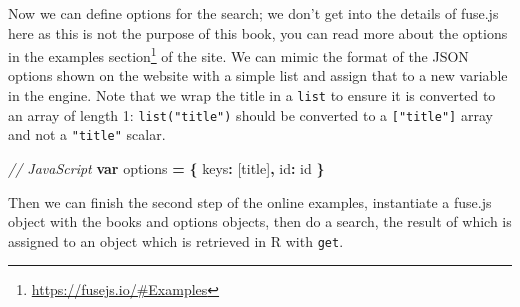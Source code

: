\documentclass[
  10pt,
]{krantz}
\makeatletter
\newenvironment{Shaded}{\begin{snugshade}}{\end{snugshade}}
\newcommand{\CommentTok}[1]{\textcolor[rgb]{0.37,0.37,0.37}{\textit{#1}}}
\newcommand{\DataTypeTok}[1]{\textcolor[rgb]{0.27,0.27,0.27}{#1}}
\newcommand{\KeywordTok}[1]{\textcolor[rgb]{0.27,0.27,0.27}{\textbf{#1}}}
\newcommand{\NormalTok}[1]{#1}
\newcommand{\OperatorTok}[1]{\textcolor[rgb]{0.43,0.43,0.43}{\textbf{#1}}}
\newcommand{\StringTok}[1]{\textcolor[rgb]{0.5,0.5,0.5}{#1}}
\renewcommand{\href}[2]{#2\footnote{\url{#1}}}
\newenvironment{kframe}{%
\medskip{}
\setlength{\fboxsep}{.8em}
 \def\at@end@of@kframe{}%
 \ifinner\ifhmode%
  \def\at@end@of@kframe{\end{minipage}}%
  \begin{minipage}{\columnwidth}%
 \fi\fi%
 \def\FrameCommand##1{\hskip\@totalleftmargin \hskip-\fboxsep
 \colorbox{shadecolor}{##1}\hskip-\fboxsep
     \hskip-\linewidth \hskip-\@totalleftmargin \hskip\columnwidth}%
 \MakeFramed {\advance\hsize-\width
   \@totalleftmargin\z@ \linewidth\hsize
   \@setminipage}}%
 {\par\unskip\endMakeFramed%
 \at@end@of@kframe}
\renewenvironment{Shaded}{\begin{kframe}}{\end{kframe}}
\makeatother
\begin{document}
Now we can define options for the search; we don't get into the details of fuse.js here as this is not the purpose of this book, you can read more about the options in the \href{https://fusejs.io/\#Examples}{examples section} of the site. We can mimic the format of the JSON options shown on the website with a simple list and assign that to a new variable in the engine. Note that we wrap the title in a \texttt{list} to ensure it is converted to an array of length 1: \texttt{list("title")} should be converted to a \texttt{{[}"title"{]}} array and not a \texttt{"title"} scalar.

\begin{Shaded}
\begin{Highlighting}[]
\CommentTok{// JavaScript}
\KeywordTok{var}\NormalTok{ options }\OperatorTok{=} \OperatorTok{\{}
  \DataTypeTok{keys}\OperatorTok{:}\NormalTok{ [}\StringTok{\textquotesingle{}title\textquotesingle{}}\NormalTok{]}\OperatorTok{,}
  \DataTypeTok{id}\OperatorTok{:} \StringTok{\textquotesingle{}id\textquotesingle{}}
\OperatorTok{\}}
\end{Highlighting}
\end{Shaded}

\begin{Shaded}
\end{Shaded}

Then we can finish the second step of the online examples, instantiate a fuse.js object with the books and options objects, then do a search, the result of which is assigned to an object which is retrieved in R with \texttt{get}.

\begin{Shaded}
\end{Shaded}
\end{document}
